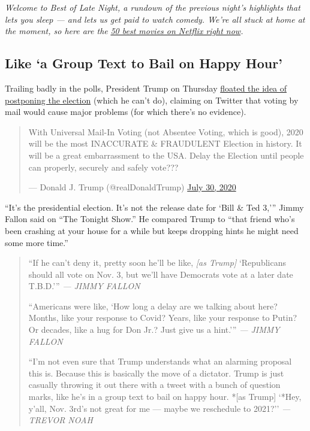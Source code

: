 \emph{Welcome to Best of Late Night, a rundown of the previous night's
highlights that lets you sleep --- and lets us get paid to watch comedy.
We're all stuck at home at the moment, so here are the}
\href{https://www.nytimes3xbfgragh.onion/interactive/2020/arts/television/best-movies-on-netflix.html}{\emph{50
best movies on Netflix right now}}\emph{.}

\hypertarget{like-a-group-text-to-bail-on-happy-hour}{%
\subsection{Like `a Group Text to Bail on Happy
Hour'}\label{like-a-group-text-to-bail-on-happy-hour}}

Trailing badly in the polls, President Trump on Thursday
\href{https://www.nytimes3xbfgragh.onion/2020/07/30/us/politics/trump-delay-2020-election.html}{floated
the idea of postponing the election} (which he can't do), claiming on
Twitter that voting by mail would cause major problems (for which
there's no evidence).

\begin{quote}
With Universal Mail-In Voting (not Absentee Voting, which is good), 2020
will be the most INACCURATE \& FRAUDULENT Election in history. It will
be a great embarrassment to the USA. Delay the Election until people can
properly, securely and safely vote???

--- Donald J. Trump (@realDonaldTrump)
\href{https://twitter.com/realDonaldTrump/status/1288818160389558273?ref_src=twsrc\%5Etfw}{July
30, 2020}
\end{quote}

``It's the presidential election. It's not the release date for `Bill \&
Ted 3,''' Jimmy Fallon said on ``The Tonight Show.'' He compared Trump
to ``that friend who's been crashing at your house for a while but keeps
dropping hints he might need some more time.''

\begin{quote}
``If he can't deny it, pretty soon he'll be like, \emph{{[}as Trump{]}}
`Republicans should all vote on Nov. 3, but we'll have Democrats vote at
a later date T.B.D.''' \emph{--- JIMMY FALLON}

``Americans were like, `How long a delay are we talking about here?
Months, like your response to Covid? Years, like your response to Putin?
Or decades, like a hug for Don Jr.? Just give us a hint.''' \emph{---
JIMMY FALLON}

``I'm not even sure that Trump understands what an alarming proposal
this is. Because this is basically the move of a dictator. Trump is just
casually throwing it out there with a tweet with a bunch of question
marks, like he's in a group text to bail on happy hour. *{[}as Trump{]}
`*Hey, y'all, Nov. 3rd's not great for me --- maybe we reschedule to
2021?'' \emph{--- TREVOR NOAH}
\end{quote}

